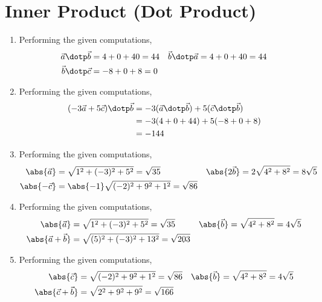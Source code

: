 \section{Inner Product (Dot Product)}
\begin{enumerate}
    \item Performing the given computations,
          \begin{align}
              \vec{a} \dotp \vec{b} & = 4 + 0 + 40 = 44 &
              \vec{b} \dotp \vec{a} & = 4 + 0 + 40 = 44   \\
              \vec{b} \dotp \vec{c} & = -8 + 0 + 8 = 0
          \end{align}

    \item Performing the given computations,
          \begin{align}
              (-3\vec{a} + 5\vec{c}) \dotp \vec{b} & = -3 (\vec{a} \dotp \vec{b})
              + 5 (\vec{c} \dotp \vec{b})                                         \\
                                                   & = -3 (4 + 0 + 44)
              + 5 (-8 + 0 + 8)                                                    \\
                                                   & = -144
          \end{align}

    \item Performing the given computations,
          \begin{align}
              \abs{\vec{a}}  & = \sqrt{1^2 + (-3)^2 + 5^2} = \sqrt{35}         &
              \abs{2\vec{b}} & = 2\sqrt{4^2 + 8^2} = 8\sqrt{5}                   \\
              \abs{-\vec{c}} & = \abs{-1}\sqrt{(-2)^2 + 9^2 + 1^2} = \sqrt{86}
          \end{align}

    \item Performing the given computations,
          \begin{align}
              \abs{\vec{a}}           & = \sqrt{1^2 + (-3)^2 + 5^2} = \sqrt{35} &
              \abs{\vec{b}}           & = \sqrt{4^2 + 8^2} = 4\sqrt{5}            \\
              \abs{\vec{a} + \vec{b}} &
              = \sqrt{(5)^2 + (-3)^2 + 13^2} = \sqrt{203}
          \end{align}

    \item Performing the given computations,
          \begin{align}
              \abs{\vec{c}}           & = \sqrt{(-2)^2 + 9^2 + 1^2} = \sqrt{86} &
              \abs{\vec{b}}           & = \sqrt{4^2 + 8^2} = 4\sqrt{5}            \\
              \abs{\vec{c} + \vec{b}} &
              = \sqrt{2^2 + 9^2 + 9^2} = \sqrt{166}
          \end{align}


\end{enumerate}
